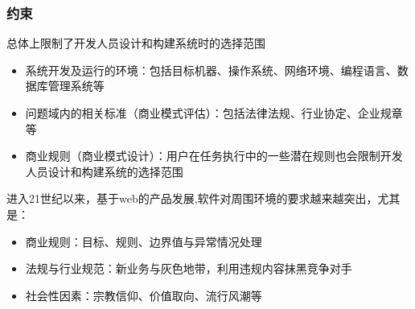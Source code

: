 \subsubsection{约束}
总体上限制了开发人员设计和构建系统时的选择范围 
\begin{itemize}
    \item 系统开发及运行的环境：包括目标机器、操作系统、网络环境、编程语言、数据库管理系统等
    \item 问题域内的相关标准（商业模式评估）：包括法律法规、行业协定、企业规章等
    \item 商业规则（商业模式设计）：用户在任务执行中的一些潜在规则也会限制开发人员设计和构建系统的选择范围
\end{itemize}

进入21世纪以来，基于web的产品发展,软件对周围环境的要求越来越突出，尤其是：
\begin{itemize}
    \item 商业规则：目标、规则、边界值与异常情况处理
    \item 法规与行业规范：新业务与灰色地带，利用违规内容抹黑竞争对手
    \item 社会性因素：宗教信仰、价值取向、流行风潮等
\end{itemize}

